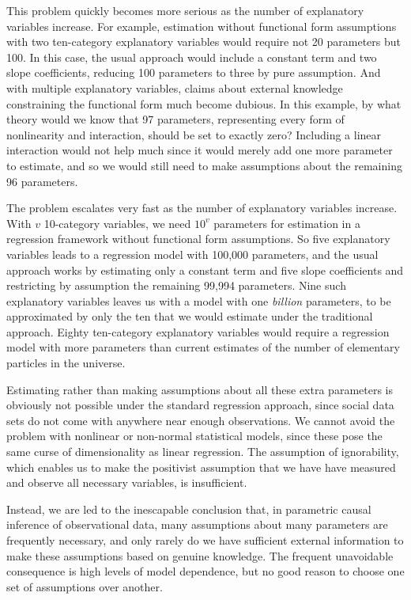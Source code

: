 \documentclass[11pt,titlepage]{article}
\begin{document}
This problem quickly becomes more serious as the number of explanatory
variables increase.  For example, estimation without functional form
assumptions with two ten-category explanatory variables would require
not 20 parameters but 100.  In this case, the usual approach would
include a constant term and two slope coefficients, reducing 100
parameters to three by pure assumption.  And with multiple explanatory
variables, claims about external knowledge constraining the functional
form much become dubious.  In this example, by what theory would we
know that 97 parameters, representing every form of nonlinearity and
interaction, should be set to exactly zero?  Including a linear
interaction would not help much since it would merely add one more
parameter to estimate, and so we would still need to make assumptions
about the remaining 96 parameters.

The problem escalates very fast as the number of explanatory variables
increase.  With $v$ 10-category variables, we need $10^v$ parameters
for estimation in a regression framework without functional form
assumptions.  So five explanatory variables leads to a regression
model with 100,000 parameters, and the usual approach works by
estimating only a constant term and five slope coefficients and
restricting by assumption the remaining 99,994 parameters.  Nine such
explanatory variables leaves us with a model with one \emph{billion}
parameters, to be approximated by only the ten that we would estimate
under the traditional approach.  Eighty ten-category explanatory
variables would require a regression model with more parameters than
current estimates of the number of elementary particles in the
universe.

Estimating rather than making assumptions about all these extra
parameters is obviously not possible under the standard regression
approach, since social data sets do not come with anywhere near enough
observations.  We cannot avoid the problem with nonlinear or
non-normal statistical models, since these pose the same curse of
dimensionality as linear regression.  The assumption of ignorability,
which enables us to make the positivist assumption that we have have
measured and observe all necessary variables, is insufficient.

Instead, we are led to the inescapable conclusion that, in parametric
causal inference of observational data, many assumptions about many
parameters are frequently necessary, and only rarely do we have
sufficient external information to make these assumptions based on
genuine knowledge.  The frequent unavoidable consequence is high
levels of model dependence, but no good reason to choose one set of
assumptions over another.  
\end{document}
